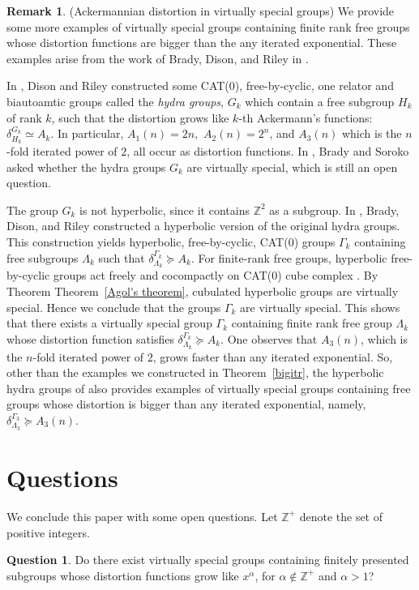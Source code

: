 \documentclass[oneside,11pt,reqno]{amsart}
\theoremstyle{definition}
\newtheorem{rem}[thm]{Remark}
\newtheorem{ques}[thm]{Question}
\begin{document}
\begin{rem} (Ackermannian distortion in virtually special groups) We provide some more examples of virtually special groups containing finite rank free groups whose distortion functions are bigger than the any iterated exponential. These examples arise from the work of Brady, Dison, and Riley in \cite{BDR}.


In \cite{DR}, Dison and Riley constructed some CAT($0$), free-by-cyclic, one relator and biautoamtic groups called the \emph{hydra groups}, $G_k$ which contain a free subgroup $H_k$ of rank $k$,  such that the distortion grows like $k$-th Ackermann's functions: $\delta_{H_k}^{G_k} \simeq A_k$. In particular, $A_1(n)=2n,$ $A_2(n)=2^n$, and $A_3(n)$ which is the $n$-fold iterated power of $2$, all occur as distortion functions. In \cite{BS}, Brady and Soroko asked whether the hydra groups $G_k$ are virtually special, which is still an open question.

The group $G_k$ is not hyperbolic, since it contains $\mathbb{Z}^2$ as a subgroup. In \cite{BDR}, Brady, Dison, and Riley constructed a hyperbolic version of the original hydra groups. This construction yields hyperbolic, free-by-cyclic, CAT($0$) groups $\Gamma_k$ containing free subgroups $\Lambda_k$ such that $\delta_{\Lambda_k}^{\Gamma_k} \succeq A_k$. 
For finite-rank free groups, hyperbolic free-by-cyclic groups act freely and cocompactly on CAT($0$) cube complex \cite{HW}. By Theorem Theorem~\ref{Agol's theorem}, cubulated hyperbolic groups are virtually special. Hence we conclude that the groups $\Gamma_k$ are virtually special. This shows that there exists a virtually special group $\Gamma_k$ containing finite rank free group $\Lambda_k$ whose distortion function satisfies 
$\delta_{\Lambda_k}^{\Gamma_k} \succeq A_k$. One observes that $A_3(n)$, which is the $n$-fold iterated power of $2$, grows faster than any iterated exponential. So, other than the examples we constructed in Theorem~\ref{bigitr}, the hyperbolic hydra groups of \cite{BDR} also provides examples of virtually special groups containing free groups whose distortion is bigger than any iterated exponential, namely, $\delta_{\Lambda_3}^{\Gamma_3} \succeq A_3(n)$.
\end{rem}

\section{Questions}

We conclude this paper with some open questions. Let $\mathbb{Z}^+$ denote the set of positive integers.\\
\begin{ques}\label{q1}  Do there exist virtually special groups containing finitely presented subgroups whose distortion functions grow like $x^{\alpha}$, for $\alpha \not\in \mathbb{Z}^{+}$ and $\alpha > 1$?
\end{ques}
\end{document}
